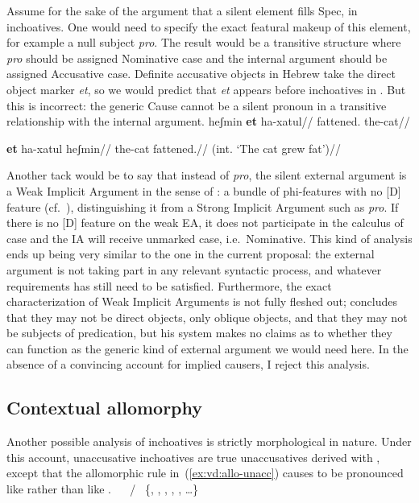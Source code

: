 Assume for the sake of the argument that a silent element fills Spec,{\vd} in inchoatives. One would need to specify the exact featural makeup of this element, for example a null subject \emph{pro}. The result would be a transitive structure where \emph{pro} should be assigned Nominative case and the internal argument should be assigned Accusative case. Definite accusative objects in Hebrew take the direct object marker \emph{et}, so we would predict that \emph{et} appears before inchoatives in \thif. But this is incorrect: the generic Cause cannot be a silent pronoun in a transitive relationship with the internal argument.
\pex
	\a \ljudge{*} \begingl
		\gla heʃmin \textbf{et} ha-xatul//
		\glb fattened.  the-cat//
	\endgl
	
	\a \ljudge{*} \begingl
		\gla \textbf{et} ha-xatul heʃmin//
		\glb {} the-cat fattened.//
		\glft (int. `The cat grew fat')//
	\endgl
\xe

Another tack would be to say that instead of \emph{pro}, the silent external argument is a Weak Implicit Argument in the sense of \cite{landau10}: a bundle of phi-features with no [D] feature (cf.~\citealt{legate14,bhattpancheva17}), distinguishing it from a Strong Implicit Argument such as \emph{pro}. If there is no [D] feature on the weak EA, it does not participate in the calculus of case and the IA will receive unmarked case, i.e.~Nominative. This kind of analysis ends up being very similar to the one in the current proposal: the external argument is not taking part in any relevant syntactic process, and whatever requirements {\vd} has still need to be satisfied. Furthermore, the exact characterization of Weak Implicit Arguments is not fully fleshed out; \citet[380]{landau10} concludes that they may not be direct objects, only oblique objects, and that they may not be subjects of predication, but his system makes no claims as to whether they can function as the generic kind of external argument we would need here. In the absence of a convincing account for implied causers, I reject this analysis.

	\subsection{Contextual allomorphy}
Another possible analysis of inchoatives is strictly morphological in nature. Under this account, unaccusative inchoatives are true unaccusatives derived with {\vz}, except that the allomorphic rule in~(\ref{ex:vd:allo-unacc}) causes {\vz} to be pronounced like {\thit} rather than like {\tnif}.
\pex
  \a \vz~\lra~ / \trace~\{, , , , , \dots \}\label{ex:vd:allo-unacc}
  \a \vz~\lra~
\xe

